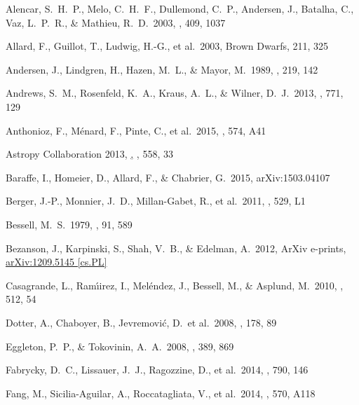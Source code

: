 \documentclass{aastex6}
\begin{document}
\begin{thebibliography}{}

 Alencar, S.~H.~P., Melo, C.~H.~F., Dullemond, C.~P., Andersen, J., Batalha, C., Vaz, L.~P.~R., \& Mathieu, R.~D.\ 2003, \aap, 409, 1037 

 Allard, F., Guillot, T., 
Ludwig, H.-G., et al.\ 2003, Brown Dwarfs, 211, 325 

 Andersen, J., Lindgren, H., Hazen, M.~L., \& Mayor, M.\ 1989, \aap, 219, 142

 Andrews, S.~M., Rosenfeld, K.~A., Kraus, A.~L., \& Wilner, D.~J.\ 2013, \apj, 771, 129

 Anthonioz, F., M{\'e}nard, F., Pinte, C., et al.\ 2015, \aap, 574, A41 

 Astropy Collaboration 2013,
  \href{http://dx.doi.org/10.1051/0004-6361/201322068}, \aap,
  558, 33
  
 Baraffe, I., Homeier, D., Allard, F., \& Chabrier, G.\ 2015, arXiv:1503.04107 

 Berger, J.-P., Monnier, J.~D., Millan-Gabet, R., et al.\ 2011, \aap, 529, L1 

 Bessell, M.~S.\ 1979, \pasp, 91, 589 

 Bezanson, J., Karpinski, S., Shah, V.~B., \& Edelman, A.\ 2012, ArXiv e-prints,
  \href{http://arxiv.org/abs/1209.5145}{{\sffamily arXiv:1209.5145 [cs.PL]}}

 Casagrande, L., Ram{\'{\i}}irez, I., Mel{\'e}ndez, J., Bessell, M., \& Asplund, M.\ 2010, \aap, 512, 54

 Dotter, A., Chaboyer, B., Jevremovi{\'c}, D.\ et al.\ 2008, \apjs, 178, 89

 Eggleton, P.~P., \& Tokovinin, A.~A.\ 2008, \mnras, 389, 869 


 Fabrycky, D.~C., Lissauer, J.~J., Ragozzine, D., et al.\ 2014, \apj, 790, 146 

 Fang, M., Sicilia-Aguilar, A., Roccatagliata, V., et al.\ 2014, \aap, 570, A118 


\end{thebibliography}
\end{document}
